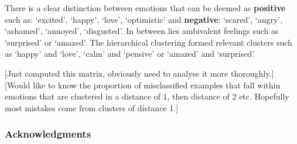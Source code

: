 \documentclass{article} %
\begin{document}
There is a clear distinction between emotions that can be deemed as \textbf{positive} such as: `excited', `happy', `love', `optimistic' and \textbf{negative}: `scared', `angry', `ashamed', `annoyed', `disgusted'. In between lies ambivalent feelings such as `surprised' or `amazed'. The hierarchical clustering formed relevant clusters such as `happy' and `love', `calm' and `pensive' or `amazed' and `surprised'.

[Just computed this matrix, obviously need to analyse it more thoroughly.]
[Would like to know the proportion of misclassified examples that fall within emotions that are clustered in a distance of 1, then distance of 2 etc. Hopefully most mistakes come from clusters of distance 1.]



\subsubsection*{Acknowledgments}



\end{document}
